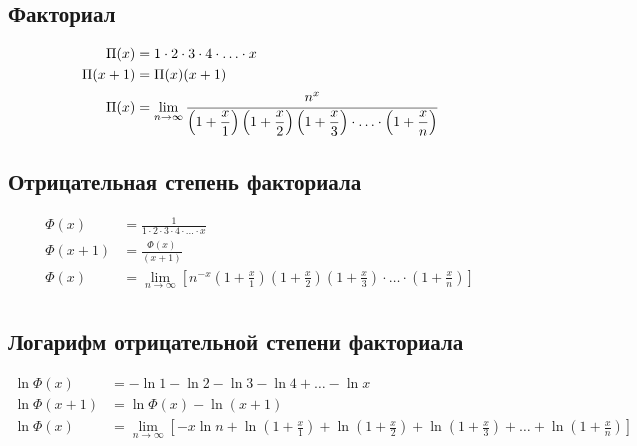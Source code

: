 \subsection{Факториал}

\begin{equation*}
\begin{aligned}
\Pi(x) &= 1 \cdot 2 \cdot 3 \cdot 4 \cdot \ldots \cdot x
\\
\Pi(x + 1) &= \Pi(x) (x + 1)
\\
\Pi(x) &= \lim_{n \to \infty}
{
\cfrac{n^x}
{
\left(1 + \displaystyle \frac{x}{1} \right) 
\left(1 + \displaystyle \frac{x}{2} \right)
\left(1 + \displaystyle \frac{x}{3} \right) 
\cdot \ldots \cdot 
\left(1 + \displaystyle \frac{x}{n} \right)
}
} \\
\end{aligned}
\end{equation*}

\subsection{Отрицательная степень факториала}

\begin{equation*}
\begin{aligned}
\Phi(x) &= \frac{1}{1 \cdot 2 \cdot 3 \cdot 4 \cdot \ldots \cdot x} \\
\Phi(x + 1) &= \frac{\Phi(x)}{(x + 1)} \\
\Phi(x) &= \lim_{n \to \infty} \left[
n^{-x}
\left(1 + \displaystyle \frac{x}{1} \right) 
\left(1 + \displaystyle \frac{x}{2} \right)
\left(1 + \displaystyle \frac{x}{3} \right) 
\cdot \ldots \cdot 
\left(1 + \displaystyle \frac{x}{n} \right) \right] \\
\end{aligned}
\end{equation*}

\subsection{Логарифм отрицательной степени факториала}

\begin{equation*}
\begin{aligned}
\ln{\Phi(x)} &= - \ln{1} - \ln{2} - \ln{3} - \ln{4} + \ldots - \ln{x} \\
\ln{\Phi(x + 1)} &= \ln{\Phi(x)} - \ln{(x + 1)} \\
\ln{\Phi(x)} &= \lim_{n \to \infty}
{\left[
- x \ln{n}
+ \ln{\left(1 + \frac{x}{1} \right)} 
+ \ln{\left(1 + \frac{x}{2} \right)}
+ \ln{\left(1 + \frac{x}{3} \right)}
+ \ldots
+ \ln{\left(1 + \frac{x}{n} \right)}
\right]} \\
\end{aligned}
\end{equation*}

